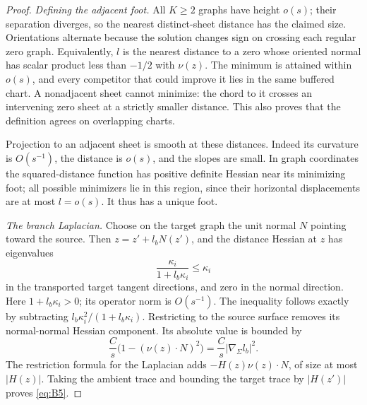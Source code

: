 \begin{proof}
\emph{Defining the adjacent foot.}
All \(K\ge2\) graphs have height \(o(s)\); their separation diverges,
so the nearest distinct-sheet distance has the claimed size.
Orientations alternate because the solution changes sign on crossing
each regular zero graph.  Equivalently, \(l\) is the nearest distance
to a zero whose oriented normal has scalar product less than
\(-1/2\) with \(\nu(z)\).  The minimum is attained within \(o(s)\),
and every competitor that could improve it lies in the same buffered
chart.  A nonadjacent sheet cannot minimize: the chord to it crosses
an intervening zero sheet at a strictly smaller distance.
This also proves that the definition agrees on overlapping charts.

Projection to an adjacent sheet is smooth at these distances.
Indeed its curvature is \(O(s^{-1})\), the distance is \(o(s)\), and
the slopes are small.  In graph coordinates the squared-distance
function has positive definite Hessian near its minimizing foot;
all possible minimizers lie in this region, since their horizontal
displacements are at most \(l=o(s)\).  It thus has a unique foot.

\emph{The branch Laplacian.}
Choose on the target graph the unit normal \(N\) pointing toward the
source.  Then \(z=z'+l_bN(z')\), and the distance Hessian at \(z\)
has eigenvalues
\[
 \frac{\kappa_i}{1+l_b\kappa_i}\le\kappa_i
\]
in the transported target tangent directions, and zero in the normal
direction.  Here \(1+l_b\kappa_i>0\); its operator norm is \(O(s^{-1})\).
The inequality follows exactly by subtracting
\(l_b\kappa_i^2/(1+l_b\kappa_i)\).
Restricting to the source surface removes its normal-normal Hessian
component.  Its absolute value is bounded by
\[
 \frac Cs\bigl(1-(\nu(z)\cdot N)^2\bigr)
   =\frac Cs|\nabla_\Sigma l_b|^2.
\]
The restriction formula for the Laplacian adds
\(-H(z)\nu(z)\cdot N\), of size at most \(|H(z)|\).
Taking the ambient trace and bounding the target trace by
\(|H(z')|\) proves \eqref{eq:B5}.


\end{proof}
